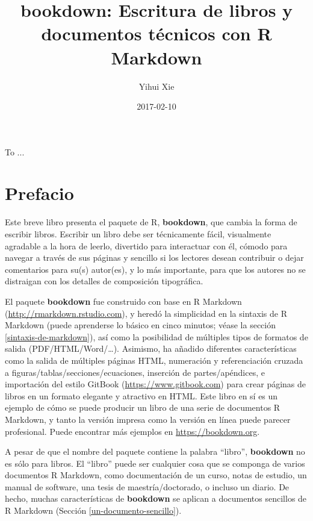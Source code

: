 \documentclass[12pt,]{krantz}
\title{bookdown: Escritura de libros y documentos técnicos con R Markdown}
\author{Yihui Xie}
\date{2017-02-10}
\theoremstyle{definition}
\theoremstyle{definition}
\theoremstyle{remark}
\begin{document}
\maketitle

\cleardoublepage\newpage\thispagestyle{empty}\null
\cleardoublepage\newpage\thispagestyle{empty}
\begin{center}
To ...
\end{center}

\setlength{\abovedisplayskip}{-5pt}
\frontmatter

{
\setcounter{tocdepth}{1}
\tableofcontents
}
\listoftables
\listoffigures
\chapter*{Prefacio}\label{prefacio}


Este breve libro presenta el paquete de R, \textbf{bookdown}, que cambia
la forma de escribir libros. Escribir un libro debe ser técnicamente
fácil, visualmente agradable a la hora de leerlo, divertido para
interactuar con él, cómodo para navegar a través de sus páginas y
sencillo si los lectores desean contribuir o dejar comentarios para
su(s) autor(es), y lo más importante, para que los autores no se
distraigan con los detalles de composición tipográfica.

El paquete \textbf{bookdown} fue construido con base en R Markdown
(\url{http://rmarkdown.rstudio.com}), y heredó la simplicidad en la
sintaxis de R Markdown (puede aprenderse lo básico en cinco minutos;
véase la sección \ref{sintaxis-de-markdown}), así como la posibilidad de
múltiples tipos de formatos de salida (PDF/HTML/Word/\ldots{}).
Asimismo, ha añadido diferentes características como la salida de
múltiples páginas HTML, numeración y referenciación cruzada a
figuras/tablas/secciones/ecuaciones, inserción de partes/apéndices, e
importación del estilo GitBook 
(\url{https://www.gitbook.com}) para crear páginas de libros en un
formato elegante y atractivo en HTML. Este libro en sí es un ejemplo de
cómo se puede producir un libro de una serie de documentos R Markdown, y
tanto la versión impresa como la versión en línea puede parecer
profesional. Puede encontrar más ejemplos en \url{https://bookdown.org}.

A pesar de que el nombre del paquete contiene la palabra ``libro'',
\textbf{bookdown} no es sólo para libros. El ``libro'' puede ser
cualquier cosa que se componga de varios documentos R Markdown, como
documentación de un curso, notas de estudio, un manual de software, una
tesis de maestría/doctorado, o incluso un diario. De hecho, muchas
características de \textbf{bookdown} se aplican a documentos sencillos
de R Markdown (Sección \ref{un-documento-sencillo}).
\end{document}

